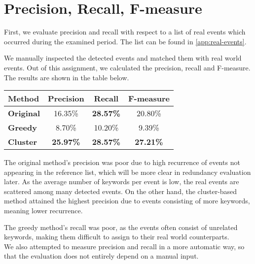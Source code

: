 \section{Precision, Recall, F-measure}

First, we evaluate precision and recall with respect to a list of real events which occurred during the examined period. The list can be found in \autoref{app:real-events}.

We manually inspected the detected events and matched them with real world events. Out of this assignment, we calculated the precision, recall and F-measure. The results are shown in the table below.

\hspace{\fill}

\begin{minipage}{\linewidth}
\centering
\begin{tabular}{ l c c c }\toprule[1.5pt]
\bf Method 	 & \bf Precision & \bf Recall & \bf F-measure \\ \midrule
\bf Original &  16.35\%     & \bf 28.57\%     &  20.80\% \\
\bf Greedy   &  8.70\%     & 10.20\%      &  9.39\% \\
\bf Cluster &  \bf 25.97\%     & \bf 28.57\%      & \bf 27.21\% \\ \bottomrule[1.25pt]
\end {tabular}\par
{} \label{tab:title}
\end{minipage}

\hspace{\fill}

The original method's precision was poor due to high recurrence of events not appearing in the reference list, which will be more clear in redundancy evaluation later. As the average number of keywords per event is low, the real events are scattered among many detected events. On the other hand, the cluster-based method attained the highest precision due to events consisting of more keywords, meaning lower recurrence.

The greedy method's recall was poor, as the events often consist of unrelated keywords, making them difficult to assign to their real world counterparts.\\

We also attempted to measure precision and recall in a more automatic way, so that the evaluation does not entirely depend on a manual input.

